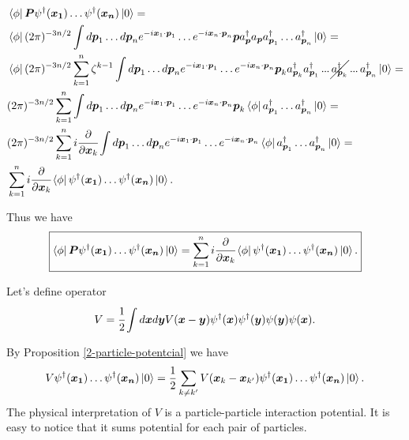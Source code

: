 \documentclass[main.tex]{subfiles}
\begin{document}
\begin{align*}
& \bra{\phi} \bs{P} \psi^\dagger(\bs{x_1}) \dots \psi^\dagger(\bs{x_n}) \ket{0} = \\
& \bra{\phi}  (2\pi)^{-3n/2}\int d\bs{p}_1 \dots d\bs{p}_n e^{-i\bs{x}_1\cdot \bs{p}_1} \dots e^{-i\bs{x}_n\cdot \bs{p}_n} \bs{p} a^\dagger_{\bs{p}}a_{\bs{p}} a^\dagger_{\bs{p}_1} \dots a^\dagger_{\bs{p}_n} \ket{0} = \\
& \bra{\phi}  (2\pi)^{-3n/2} \sum_{k=1}^n \zeta^{k - 1} \int d\bs{p}_1 \dots d\bs{p}_n e^{-i\bs{x}_1\cdot \bs{p}_1} \dots e^{-i\bs{x}_n\cdot \bs{p}_n} \bs{p}_k a^\dagger_{\bs{p}_k} a^\dagger_{\bs{p}_1} \tdots \cancel{a^\dagger_{\bs{p}_k}} \tdots a^\dagger_{\bs{p}_n} \ket{0} = \\
&  (2\pi)^{-3n/2} \sum_{k=1}^n  \int d\bs{p}_1 \dots d\bs{p}_n e^{-i\bs{x}_1\cdot \bs{p}_1} \dots e^{-i\bs{x}_n\cdot \bs{p}_n} \bs{p}_k \bra{\phi} a^\dagger_{\bs{p}_1} \dots a^\dagger_{\bs{p}_n} \ket{0} = \\
& (2\pi)^{-3n/2} \sum_{k=1}^n  i\cfrac{\partial}{\partial \bs{x}_k}  \int d\bs{p}_1 \dots d\bs{p}_n e^{-i\bs{x}_1\cdot \bs{p}_1} \dots e^{-i\bs{x}_n\cdot \bs{p}_n}  \bra{\phi} a^\dagger_{\bs{p}_1} \dots a^\dagger_{\bs{p}_n} \ket{0} = \\
&\sum_{k=1}^n  i\cfrac{\partial}{\partial \bs{x}_k} \bra{\phi} \psi^\dagger(\bs{x_1}) \dots \psi^\dagger(\bs{x_n}) \ket{0}.
\end{align*}

Thus we have
\begin{equation}
\boxed{
 \bra{\phi} \boldsymbol{P} \psi^\dagger(\boldsymbol{x_1}) \dots \psi^\dagger(\boldsymbol{x_n}) \ket{0} = 
 \sum_{k=1}^n  i\cfrac{\partial}{\partial \boldsymbol{x}_k} \bra{\phi} \psi^\dagger(\boldsymbol{x_1}) \dots \psi^\dagger(\boldsymbol{x_n}) \ket{0}.
}
\end{equation}

Let's define operator
\begin{equation}
V = \cfrac{1}{2} \int d\boldsymbol{x} d\boldsymbol{y} V(\boldsymbol{x} - \boldsymbol{y}) \psi^\dagger(\boldsymbol{x}) \psi^\dagger(\boldsymbol{y}) \psi(\boldsymbol{y}) \psi(\boldsymbol{x}).
\end{equation}

By Proposition \ref{2-particle-potentcial} we have
\begin{equation}
V \psi^\dagger(\boldsymbol{x_1}) \dots \psi^\dagger(\boldsymbol{x_n}) \ket{0} = \frac{1}{2}
\sum_{k\not=k'}V(\boldsymbol{x}_k - \boldsymbol{x}_{k'}) \psi^\dagger(\boldsymbol{x_1}) \dots \psi^\dagger(\boldsymbol{x_n}) \ket{0}.
\end{equation}
The physical interpretation of $V$ is a particle-particle interaction potential. It is easy to notice that it sums potential for each pair of particles.
\end{document}
